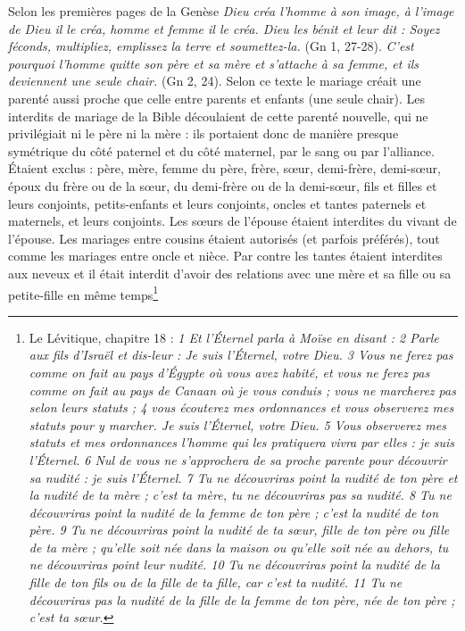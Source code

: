 Selon les premières pages de la Genèse \emph{Dieu créa l'homme à son image, à l'image de Dieu il le créa, homme et femme il le créa. Dieu les bénit et leur dit : Soyez féconds, multipliez, emplissez la terre et soumettez-la.} (Gn 1, 27-28). \emph{C'est pourquoi l'homme quitte son père et sa mère et s'attache à sa femme, et ils deviennent une seule chair.} (Gn 2, 24). Selon ce texte le mariage créait une parenté aussi proche que celle entre parents et enfants (une seule chair). Les interdits de mariage de la Bible découlaient de cette parenté nouvelle, qui ne privilégiait ni le père ni la mère : ils portaient donc de manière presque symétrique du côté paternel et du côté maternel, par le sang ou par l'alliance. Étaient exclus : père, mère, femme du père, frère, sœur, demi-frère, demi-sœur, époux du frère ou de la sœur, du demi-frère ou de la demi-sœur, fils et filles et leurs conjoints, petits-enfants et leurs conjoints, oncles et tantes paternels et maternels, et leurs conjoints. Les sœurs de l'épouse étaient interdites du vivant de l'épouse.  Les mariages entre cousins étaient autorisés (et parfois préférés), tout comme les mariages entre oncle et nièce. Par contre les tantes étaient interdites aux neveux et il était interdit d'avoir des relations avec une mère et sa fille ou sa petite-fille en même temps\footnote{Le Lévitique, chapitre 18 : \emph{1 Et l'Éternel parla à Moïse en disant :
2 Parle aux fils d'Israël et dis-leur : Je suis l'Éternel, votre Dieu.
3 Vous ne ferez pas comme on fait au pays d'Égypte où vous avez habité, et vous ne ferez pas comme on fait au pays de Canaan où je vous conduis ; vous ne marcherez pas selon leurs statuts ;
4 vous écouterez mes ordonnances et vous observerez mes statuts pour y marcher. Je suis l'Éternel, votre Dieu.
5 Vous observerez mes statuts et mes ordonnances l'homme qui les pratiquera vivra par elles : je suis l'Éternel.
6 Nul de vous ne s'approchera de sa proche parente pour découvrir sa nudité : je suis l'Éternel.
7 Tu ne découvriras point la nudité de ton père et la nudité de ta mère ; c'est ta mère, tu ne découvriras pas sa nudité.
8 Tu ne découvriras point la nudité de la femme de ton père ; c'est la nudité de ton père.
9 Tu ne découvriras point la nudité de ta sœur, fille de ton père ou fille de ta mère ; qu'elle soit née dans la maison ou qu'elle soit née au dehors, tu ne découvriras point leur nudité.
10 Tu ne découvriras point la nudité de la fille de ton fils ou de la fille de ta fille, car c'est ta nudité.
11 Tu ne découvriras pas la nudité de la fille de la femme de ton père, née de ton père ; c'est ta sœur.
}}
